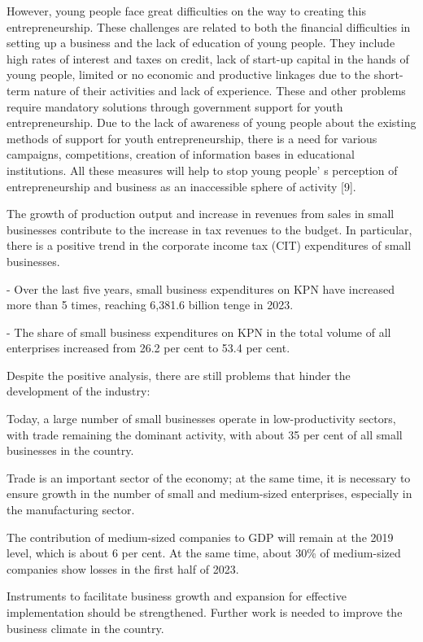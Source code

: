 However, young people face great difficulties on the way to creating
this entrepreneurship. These challenges are related to both the
financial difficulties in setting up a business and the lack of
education of young people. They include high rates of interest and taxes
on credit, lack of start-up capital in the hands of young people,
limited or no economic and productive linkages due to the short-term
nature of their activities and lack of experience. These and other
problems require mandatory solutions through government support for
youth entrepreneurship. Due to the lack of awareness of young people
about the existing methods of support for youth entrepreneurship, there
is a need for various campaigns, competitions, creation of information
bases in educational institutions. All these measures will help to stop
young people' s perception of entrepreneurship and
business as an inaccessible sphere of activity {[}9{]}.

The growth of production output and increase in revenues from sales in
small businesses contribute to the increase in tax revenues to the
budget. In particular, there is a positive trend in the corporate income
tax (CIT) expenditures of small businesses.

- Over the last five years, small business expenditures on KPN have
increased more than 5 times, reaching 6,381.6 billion tenge in 2023.

- The share of small business expenditures on KPN in the total volume of
all enterprises increased from 26.2 per cent to 53.4 per cent.

Despite the positive analysis, there are still problems that hinder the
development of the industry:

Today, a large number of small businesses operate in low-productivity
sectors, with trade remaining the dominant activity, with about 35 per
cent of all small businesses in the country.

Trade is an important sector of the economy; at the same time, it is
necessary to ensure growth in the number of small and medium-sized
enterprises, especially in the manufacturing sector.

The contribution of medium-sized companies to GDP will remain at the
2019 level, which is about 6 per cent. At the same time, about 30\% of
medium-sized companies show losses in the first half of 2023.

Instruments to facilitate business growth and expansion for effective
implementation should be strengthened. Further work is needed to improve
the business climate in the country.


